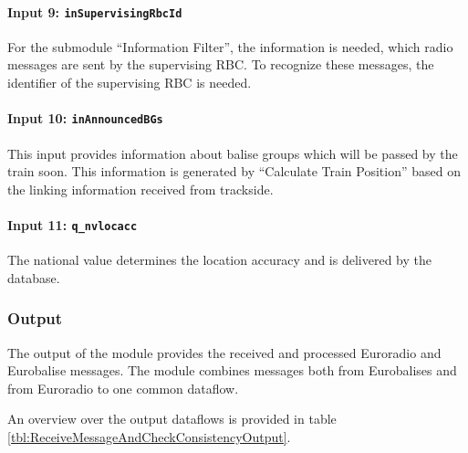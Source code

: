 \paragraph{Input 9: \texttt{inSupervisingRbcId}}
For the submodule ``Information Filter'', the information is needed, which radio messages are sent by the supervising RBC. To recognize these messages, the identifier of the supervising RBC is needed.

\paragraph{Input 10: \texttt{inAnnouncedBGs}}
This input provides information about balise groups which will be passed by the train soon. This information is generated by ``Calculate Train Position'' based on the linking information received from trackside.

\paragraph{Input 11: \texttt{q\_nvlocacc}}
The national value determines the location accuracy and is delivered by the database.



\subsubsection{Output}
The output of the module provides the received and processed Euroradio and Eurobalise messages. The module combines messages both from Eurobalises and from Euroradio to one common dataflow.

An overview over the output dataflows is provided in table \ref{tbl:ReceiveMessageAndCheckConsistencyOutput}.

